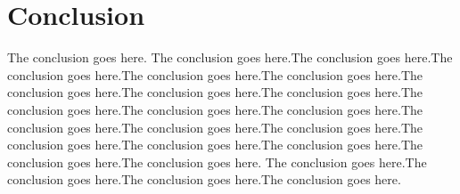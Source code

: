 \documentclass[10pt,journal,cspaper,compsoc]{IEEEtran}
\begin{document}
%





\section{Conclusion}
The conclusion goes here. The conclusion goes here.The conclusion goes here.The conclusion goes here.The conclusion goes here.The conclusion goes here.The conclusion goes here.The conclusion goes here.The conclusion goes here.The conclusion goes here.The conclusion goes here.The conclusion goes here.The conclusion goes here.The conclusion goes here.The conclusion goes here.The conclusion goes here.The conclusion goes here.The conclusion goes here.The conclusion goes here.The conclusion goes here. The conclusion goes here.The conclusion goes here.The conclusion goes here.The conclusion goes here.
\end{document}
